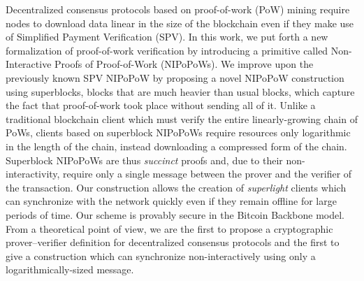 Decentralized consensus protocols based on proof-of-work (PoW) mining require nodes to download data linear in the size of the blockchain even if they make use of Simplified Payment Verification (SPV). In this work, we put forth a new formalization of proof-of-work verification by introducing a primitive called Non-Interactive Proofs of Proof-of-Work (NIPoPoWs). We improve upon the previously known SPV NIPoPoW by proposing a novel NIPoPoW construction using superblocks, blocks that are much heavier than usual blocks, which capture the fact that proof-of-work took place without sending all of it. Unlike a traditional blockchain client which must verify the entire linearly-growing chain of PoWs, clients based on superblock NIPoPoWs require resources only logarithmic in the length of the chain, instead downloading a compressed form of the chain. Superblock NIPoPoWs are thus \emph{succinct} proofs and, due to their non-interactivity, require only a single message between the prover and the verifier of the transaction. Our construction allows the creation of \emph{superlight} clients which can synchronize with the network quickly even if they remain offline for large periods of time. Our scheme is provably secure in the Bitcoin Backbone model. From a theoretical point of view, we are the first to propose a cryptographic prover--verifier definition for decentralized consensus protocols and the first to give a construction which can synchronize non-interactively using only a logarithmically-sized message.
